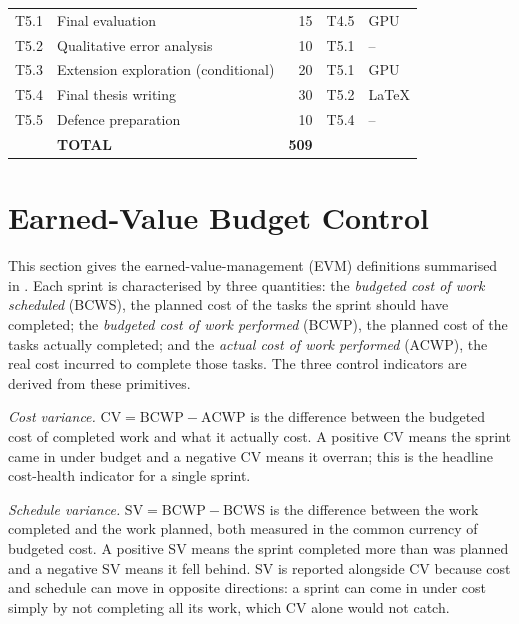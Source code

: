 \begin{table}[H]
\begin{tabularx}{\linewidth}{c >{\raggedright}p{4.2cm} r >{\raggedright\arraybackslash}p{2.2cm} >{\raggedright\arraybackslash}p{2.0cm}}
        \midrule
        T5.1 & Final evaluation                     & 15  & T4.5           & GPU \\
        T5.2 & Qualitative error analysis           & 10  & T5.1           & -- \\
        T5.3 & Extension exploration (conditional)  & 20  & T5.1           & GPU \\
        T5.4 & Final thesis writing                 & 30  & T5.2           & \LaTeX{} \\
        T5.5 & Defence preparation                  & 10  & T5.4           & -- \\
        \midrule
        & \textbf{TOTAL}                            & \textbf{509} & & \\
        \bottomrule
    \end{tabularx}
\end{table}

\section{Earned-Value Budget Control}
\label{app:evm}

This section gives the earned-value-management (EVM) definitions
summarised in .
Each sprint is characterised by three quantities: the
\textit{budgeted cost of work scheduled} (BCWS), the planned cost of
the tasks the sprint should have completed; the \textit{budgeted cost
of work performed} (BCWP), the planned cost of the tasks actually
completed; and the \textit{actual cost of work performed} (ACWP), the
real cost incurred to complete those tasks.
The three control indicators are derived from these primitives.

\textit{Cost variance.}
$\mathrm{CV} = \mathrm{BCWP} - \mathrm{ACWP}$ is the difference
between the budgeted cost of completed work and what it actually
cost.
A positive CV means the sprint came in under budget and a negative
CV means it overran; this is the headline cost-health indicator for
a single sprint.

\textit{Schedule variance.}
$\mathrm{SV} = \mathrm{BCWP} - \mathrm{BCWS}$ is the difference
between the work completed and the work planned, both measured in
the common currency of budgeted cost.
A positive SV means the sprint completed more than was planned and a
negative SV means it fell behind.
SV is reported alongside CV because cost and schedule can move in
opposite directions: a sprint can come in under cost simply by
not completing all its work, which CV alone would not catch.


